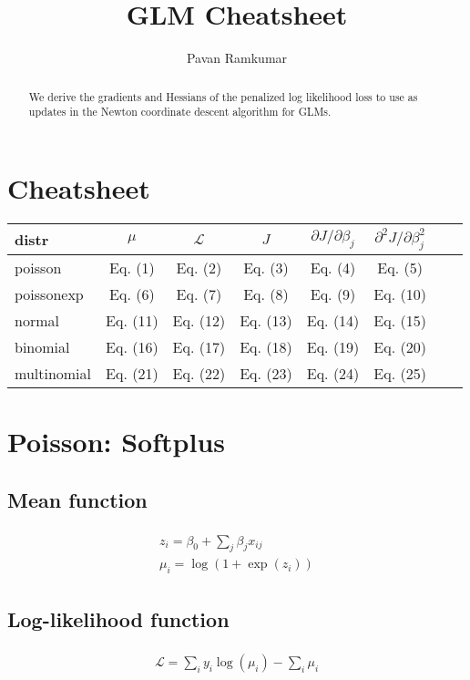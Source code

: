\documentclass[a4paper]{article}
\title{GLM Cheatsheet}
\author{Pavan Ramkumar}
\begin{document}
\maketitle

\begin{abstract}
We derive the gradients and Hessians of the penalized log likelihood loss to use as updates in the Newton coordinate descent algorithm for GLMs.
\end{abstract}


\section{Cheatsheet}



\begin{tabular}{l*{6}{c}r}
distr              & $\mu$ & $\mathcal{L}$ & $J$ & $\partial J / \partial \beta_j$ & $\partial^2 J / \partial \beta_j^2$ \\
\hline
poisson	 	& Eq. (1) & Eq. (2) & Eq. (3) & Eq. (4) & Eq. (5) \\
poissonexp      & Eq. (6) & Eq. (7) & Eq. (8) & Eq. (9) & Eq. (10) \\
normal            & Eq. (11) & Eq. (12) & Eq. (13) & Eq. (14) & Eq. (15) \\
binomial          & Eq. (16) & Eq. (17) & Eq. (18) & Eq. (19) & Eq. (20) \\
multinomial     & Eq. (21) & Eq. (22) & Eq. (23) & Eq. (24) & Eq. (25) \\
\end{tabular}

\section{Poisson: Softplus}

\subsection{Mean function}
\def \poissonmean{
\begin{align}
\begin{split}
z_i = \beta_0 + \sum_j \beta_j x_{ij} \\
\mu_i = \log( 1 + \exp(z_i) )
\end{split}
\end{align}
}
\poissonmean

\subsection{Log-likelihood function}
\def \poissonlogL{
\begin{align}
\begin{split}
\mathcal{L} = \sum_i y_i \log(\mu_i) - \sum_i \mu_i
\end{split}
\end{align}
}
\poissonlogL
\end{document}

